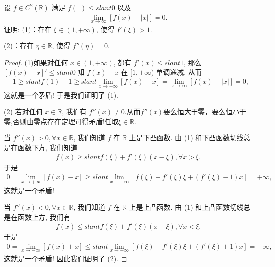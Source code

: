 \documentclass[../../main.tex]{subfiles}
\begin{document}
\begin{example}
设 $f\in C^2(\mathbb{R})$ 满足 $f(1)\leqslant slant0$ 以及
\begin{align*}
\lim_{x\to\infty}[f(x)-|x|]=0.
\tag{12.27}
\end{align*}
证明:
(1)：存在 $\xi\in(1,+\infty)$, 使得 $f'(\xi)>1$.

(2)：存在 $\eta\in\mathbb{R}$, 使得 $f''(\eta)=0$.
\end{example}
\begin{proof}
(1)如果对任何 $x\in(1,+\infty)$, 都有 $f'(x)\leqslant slant1$, 那么 $[f(x)-x]'\leqslant slant0$ 知 $f(x)-x$ 在 $[1,+\infty)$ 单调递减. 从而
\begin{align*}
-1\geqslant slant f(1)-1\geqslant slant\lim_{x\to+\infty}[f(x)-x]=\lim_{x\to\infty}[f(x)-|x|]=0,
\end{align*}
这就是一个矛盾! 于是我们证明了 (1).

(2)
若对任何 $x\in\mathbb{R}$, 我们有 $f''(x)\neq0$.从而$f''(x)$要么恒大于零，要么恒小于零,否则由零点存在定理可得矛盾!任取$\xi \in \mathbb{R}$.

当 $f''(x)>0,\forall x\in\mathbb{R}$, 我们知道 $f$ 在 $\mathbb{R}$ 上是下凸函数. 由 (1) 和下凸函数切线总是在函数下方, 我们知道
\begin{align*}
f(x)\geqslant slant f(\xi)+f'(\xi)(x-\xi),\forall x>\xi.
\end{align*}
于是
\begin{align*}
0=\lim_{x\to+\infty}[f(x)-x]\geqslant slant\lim_{x\to+\infty}[f(\xi)-f'(\xi)\xi+(f'(\xi)-1)x]=+\infty,
\end{align*}
这就是一个矛盾!

当 $f''(x)<0,\forall x\in\mathbb{R}$, 我们知道 $f$ 在 $\mathbb{R}$ 上是上凸函数. 由 (1) 和上凸函数切线总是在函数上方, 我们有
\begin{align*}
f(x)\leqslant slant f(\xi)+f'(\xi)(x-\xi),\forall x<\xi.
\end{align*}
于是
\begin{align*}
0=\lim_{x\to-\infty}[f(x)+x]\leqslant slant\lim_{x\to-\infty}[f(\xi)-f'(\xi)\xi+(f'(\xi)+1)x]=-\infty,
\end{align*}
这就是一个矛盾! 因此我们证明了 (2). 
\end{proof}
\end{document}
